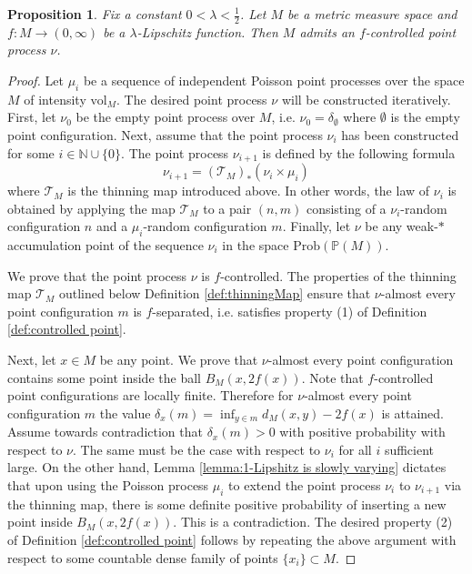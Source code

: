 \documentclass{amsart}
\newcommand{\NN}{\mathbb{N}}
\newcommand{\Points}{\mathbb{P}}
\newcommand{\Prob}[1]{\mathrm{Prob}\left(#1\right)}
\theoremstyle{plain}
\newtheorem{prop}[theorem]{Proposition}
\numberwithin{equation}{section}
\theoremstyle{definition}
\begin{document}
\begin{prop}
\label{prop:there exists controlled point processes on mms}
Fix a constant $0 < \lambda < \frac{1}{2}$. Let $M$ be a metric measure space and $f : M \to (0,\infty)$ be a $\lambda$-Lipschitz function. Then $M$ admits an $f$-controlled point process $\nu$.
\end{prop}
\begin{proof}
Let $\mu_i$  be a sequence of independent Poisson point processes over the space $M$ of intensity $\mathrm{vol}_M$. The desired point process $\nu$ will be constructed iteratively.
First, let $\nu_0$ be the empty point process over $M$, i.e. $\nu_0 = \delta_\emptyset$ where $\emptyset$ is the empty point configuration.
Next, assume that the point process  $\nu_i$ has been constructed for some $i \in \NN \cup \{0\}$. 
The point process $\nu_{i+1}$ is defined by the following   formula
$$ \nu_{i+1} =  (\mathcal{T}_M)_* (\nu_{i} \times \mu_{i})$$
where $\mathcal{T}_M$ is the thinning map introduced above. In other words, the law of $\nu_i$ is obtained by applying the map $\mathcal{T}_M$ to a pair $(n,m)$ consisting of a $\nu_i$-random configuration $n$ and a $\mu_i$-random configuration $m$.
Finally, let $\nu$ be any weak-$*$ accumulation point of the sequence $\nu_i$ in the space $\Prob{\Points(M)}$.

We prove that the point process $\nu$ is $f$-controlled.
The properties of the thinning map $\mathcal{T}_M$ outlined below Definition \ref{def:thinningMap} ensure that $\nu$-almost every point configuration $m$ is $f$-separated, i.e. satisfies property (1) of Definition \ref{def:controlled point}. 

Next, let $x \in M$ be any point. We prove that $\nu$-almost every point configuration contains some point inside the ball $B_M(x,2f(x))$. Note that $f$-controlled point configurations are locally finite. Therefore for $\nu$-almost every point configuration $m$ the value $\delta_x(m)= \inf_{y\in m} d_M(x,y) -2f(x)$ is attained. Assume towards contradiction that $\delta_x(m) > 0$ with positive probability with respect to $\nu$. The same must be the case with respect to $\nu_i$ for all $i$ sufficient large. On the other hand, Lemma \ref{lemma:1-Lipshitz is slowly varying} dictates that upon using the  Poisson process $\mu_i$ to extend the point process  $\nu_i$ to  $\nu_{i+1}$  via the thinning map, there is some definite positive probability of inserting a new point inside $B_M(x,2f(x))$. This is a contradiction. The desired property (2) of Definition \ref{def:controlled point} follows by repeating the above argument with respect to some countable dense family of points $\{x_i\} \subset M$.
\end{proof}
\end{document}
